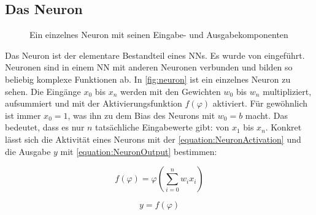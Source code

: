 \subsection{Das Neuron}
\label{chap:neuron}

\begin{figure}
  \centering
  \caption{Ein einzelnes Neuron mit seinen Eingabe- und Ausgabekomponenten}
  \label{fig:neuron}
\end{figure}

Das Neuron ist der elementare Bestandteil eines \acp{NN}. Es wurde \citeyear{McCulloch1943} von \citeauthor{McCulloch1943} \cite{McCulloch1943} eingeführt. Neuronen sind in einem \ac{NN} mit anderen Neuronen verbunden und bilden so beliebig komplexe Funktionen ab. In \autoref{fig:neuron} ist ein einzelnes Neuron zu sehen. Die Eingänge $x_{0}$ bis $x_{n}$ werden mit den Gewichten $w_{0}$ bis $w_{n}$ multipliziert, aufsummiert und mit der Aktivierungsfunktion $f(\varphi)$ aktiviert. Für gewöhnlich ist immer $x_{0}=1$, was ihn zu dem Bias des Neurons mit $w_{0}=b$ macht. Das bedeutet, dass es nur $n$ tatsächliche Eingabewerte gibt: von $x_{1}$ bis $x_{n}$. Konkret lässt sich die Aktivität eines Neurons mit der \autoref{equation:NeuronActivation} und die Ausgabe $y$ mit \autoref{equation:NeuronOutput} bestimmen:

\begin{equation}
  f(\varphi) = \varphi(\sum_{i=0}^{n}w_{i}x_{i})
  \label{equation:NeuronActivation}
\end{equation}

\begin{equation}
  y = f(\varphi)
  \label{equation:NeuronOutput}
\end{equation}

